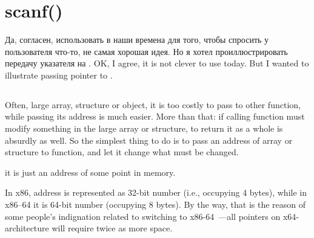 \section{scanf()}
\label{label_scanf}




\IFRU
{Да, согласен, использовать \scanf в наши времена для того, чтобы спросить у пользователя что-то, 
не самая хорошая идея.
Но я хотел проиллюстрировать передачу указателя на \Tint.}
{OK, I agree, it is not clever to use \scanf today. But I wanted to illustrate passing pointer to \Tint.}

\subsection{}
\index{\CLanguageElements!\Pointers}

{Often, large array, structure or object, it is too costly to pass to other function, 
while passing its address is much easier.}
{More than that: if calling function must modify something in the large array or structure,
to return it as a whole is absurdly as well.}
{So the simplest thing to do is to pass an address of array or structure to function,
and let it change what must be changed.}

 \CCpp {}
{it is just an address of some point in memory.}

{In x86, address is represented as 32-bit number (i.e., occupying 4 bytes), while in x86--64 it is 64-bit number
(occupying 8 bytes).}
{By the way, that is the reason of some people's indignation related to switching to x86-64~---all pointers
on x64-architecture will require twice as more space.}

